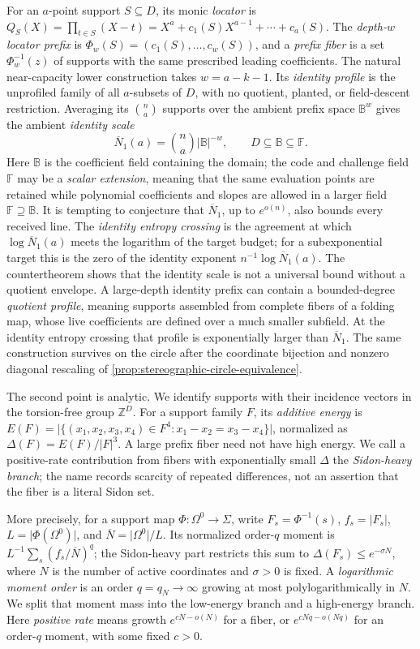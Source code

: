\documentclass[12pt,a4paper]{amsart}
\numberwithin{equation}{section}
\theoremstyle{remark}
\newcommand{\F}{\mathbb F}
\newcommand{\B}{\mathbb B}
\newcommand{\Z}{\mathbb Z}
\newcommand{\barN}{\overline N}
\newcommand{\abs}[1]{\lvert #1\rvert}
\begin{document}
For an \(a\)-point support \(S\subseteq D\), its monic
\emph{locator} is
\(Q_S(X)=\prod_{t\in S}(X-t)=X^a+c_1(S)X^{a-1}+\cdots+c_a(S)\).
The \emph{depth-\(w\) locator prefix} is
\(\Phi_w(S)=(c_1(S),\ldots,c_w(S))\), and a \emph{prefix fiber} is a
set \(\Phi_w^{-1}(z)\) of supports with the same prescribed leading
coefficients.  The natural near-capacity lower construction takes
\(w=a-k-1\).  Its \emph{identity profile} is the unprofiled family of
all \(a\)-subsets of \(D\), with no quotient, planted, or field-descent
restriction.  Averaging its \(\binom na\) supports over the ambient
prefix space \(\B^w\) gives the ambient \emph{identity scale}
\[
        \barN_1(a)=\binom na\abs\B^{-w},
        \qquad D\subseteq\B\subseteq\F.
        \tag{1.5}\label{eq:intro-identity-scale}
\]
Here \(\B\) is the coefficient field containing the domain; the code and
challenge field \(\F\) may be a \emph{scalar extension}, meaning that the
same evaluation points are retained while polynomial coefficients and
slopes are allowed in a larger field \(\F\supseteq\B\).  It is tempting to
conjecture that \(\barN_1\), up to \(e^{o(n)}\), also bounds every
received line.  The \emph{identity entropy crossing} is the agreement at
which \(\log\barN_1(a)\) meets the logarithm of the target budget; for a
subexponential target this is the zero of the identity exponent
\(n^{-1}\log\barN_1(a)\).  The
countertheorem shows that the identity scale is not a universal bound without a
quotient envelope.  A large-depth identity prefix can contain a bounded-degree
\emph{quotient profile}, meaning supports assembled from complete fibers
of a folding map, whose live coefficients are defined over a much smaller
subfield.  At the identity entropy crossing that profile is exponentially
larger than \(\barN_1\).  The same construction survives on the circle
after the coordinate bijection and nonzero diagonal rescaling of
\cref{prop:stereographic-circle-equivalence}.

The second point is analytic.  We identify supports with their incidence
vectors in the torsion-free group \(\Z^D\).  For a support family \(F\),
its \emph{additive energy} is
\(E(F)=\abs{\{(x_1,x_2,x_3,x_4)\in F^4:x_1-x_2=x_3-x_4\}}\), normalized
as \(\Delta(F)=E(F)/\abs F^3\).  A large prefix fiber need not have high
energy.  We call a positive-rate contribution from fibers with
exponentially small \(\Delta\) the \emph{Sidon-heavy branch}; the name
records scarcity of repeated differences, not an assertion that the
fiber is a literal Sidon set.

More precisely, for a support map
\(\Phi:\Omega^0\to\Sigma\), write
\(F_s=\Phi^{-1}(s)\), \(f_s=\abs{F_s}\),
\(L=\abs{\Phi(\Omega^0)}\), and
\(\barN=\abs{\Omega^0}/L\).  Its normalized order-\(q\) moment is
\(L^{-1}\sum_s(f_s/\barN)^q\); the Sidon-heavy part restricts this sum to
\(\Delta(F_s)\le e^{-\sigma N}\), where \(N\) is the number of active
coordinates and \(\sigma>0\) is fixed.  A \emph{logarithmic moment order}
is an order \(q=q_N\to\infty\) growing at most polylogarithmically in
\(N\).  We split that moment mass into the low-energy branch and a
high-energy branch.  Here \emph{positive rate} means growth
\(e^{cN-o(N)}\) for a fiber, or \(e^{cNq-o(Nq)}\) for an order-\(q\)
moment, with some fixed \(c>0\).
\end{document}
